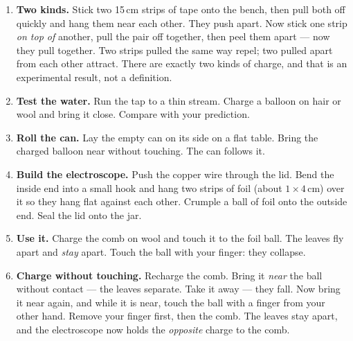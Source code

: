\begin{enumerate}
\item \textbf{Two kinds.} Stick two 15\,cm strips of tape onto the bench, then
  pull both off quickly and hang them near each other. They push apart. Now
  stick one strip \emph{on top of} another, pull the pair off together, then
  peel them apart --- now they pull together. Two strips pulled the same way
  repel; two pulled apart from each other attract. There are exactly two kinds
  of charge, and that is an experimental result, not a definition.
\item \textbf{Test the water.} Run the tap to a thin stream. Charge a balloon on
  hair or wool and bring it close. Compare with your prediction.
\item \textbf{Roll the can.} Lay the empty can on its side on a flat table. Bring
  the charged balloon near without touching. The can follows it.
\item \textbf{Build the electroscope.} Push the copper wire through the lid.
  Bend the inside end into a small hook and hang two strips of foil
  (about $1\times4$\,cm) over it so they hang flat against each other. Crumple a
  ball of foil onto the outside end. Seal the lid onto the jar.
\item \textbf{Use it.} Charge the comb on wool and touch it to the foil ball. The
  leaves fly apart and \emph{stay} apart. Touch the ball with your finger: they
  collapse.
\item \textbf{Charge without touching.} Recharge the comb. Bring it \emph{near}
  the ball without contact --- the leaves separate. Take it away --- they fall.
  Now bring it near again, and while it is near, touch the ball with a finger
  from your other hand. Remove your finger first, then the comb. The leaves stay
  apart, and the electroscope now holds the \emph{opposite} charge to the comb.
\end{enumerate}

\begin{telosfacts}[0.20]
\end{telosfacts}

